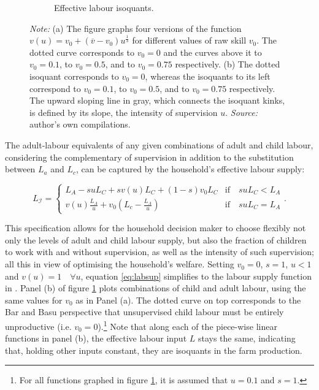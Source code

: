 \documentclass[a4paper,12pt]{article}
\theoremstyle{plain}
\theoremstyle{definition}
\theoremstyle{definition}
\theoremstyle{definition}
\theoremstyle{definition}
\begin{document}
\begin{figure}[t!]
\begin{subfigure}[t]{0.45\textwidth}
        \caption{Effective labour isoquants.}
    \end{subfigure}
    \caption*{\footnotesize{\textit{Note:} (a) The figure graphs four versions of the function $v(u)=v_0+(\overline{v}-v_0)u^{\frac{1}{3}}$ for different values of raw skill $v_0$. The dotted curve corresponds to $v_0=0$ and the curves above it to $v_0=0.1$, to $v_0=0.5$, and to $v_0=0.75$ respectively. (b) The dotted isoquant corresponds to $v_0=0$, whereas the isoquants to its left correspond to $v_0=0.1$, to $v_0=0.5$, and to $v_0=0.75$ respectively. The upward sloping line in gray, which connects the isoquant kinks, is defined by its slope, the intensity of supervision $u$. \textit{Source:}  author's own compilations.}}
    \label{fig:model}
\end{figure}


The adult-labour equivalents of any given combinations of adult and child labour, considering the complementary of supervision in addition to the substitution between $L_a$ and $L_c$, can be captured by the household's effective labour supply:

\begin{equation}
\label{eq:labsup}
    L_{\mathcal{I}} =
        \begin{cases}
            L_A - s u L_C + s v(u) L_C + (1-s) v_0 L_C & \text{if} \quad s u L_C < L_A \\
            v(u) \frac{L_A}{u} + v_0 \left(L_c - \frac{L_A}{u}\right) \quad & \text {if} \quad s u L_C = L_A
        \end{cases}
        .
\end{equation}

This specification allows for the household decision maker to choose flexibly not only the levels of adult and child labour supply, but also the fraction of children to work with and without supervision, as well as the intensity of such supervision; all this in view of optimising the household's welfare. Setting $v_0=0$, $s=1$, $u<1$ and $v(u)=1 \quad \forall u$, equation \ref{eq:labsup} simplifies to the labour supply function in \citet{Bar2009}. Panel (b) of figure \ref{fig:model} plots combinations of child and adult labour, using the same values for $v_0$ as in Panel (a). The dotted curve on top corresponds to the Bar and Basu perspective that unsupervised child labour must be entirely unproductive (i.e. $v_0=0$).\footnote{For all functions graphed in figure \ref{fig:model}, it is assumed that $u=0.1$ and $s=1$.} Note that along each of the piece-wise linear functions in panel (b), the effective labour input $L$ stays the same, indicating that, holding other inputs constant, they are isoquants in the farm production.
\end{document}
